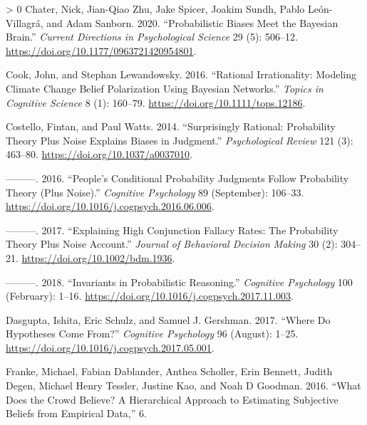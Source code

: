 \documentclass{article}
\newlength{\cslhangindent}
\newenvironment{CSLReferences}[3] %
 {%
  \setlength{\parindent}{0pt}
  \ifodd #1 \everypar{\setlength{\hangindent}{\cslhangindent}}\ignorespaces\fi
  \ifnum #2 > 0
  \setlength{\parskip}{#2\baselineskip}
  \fi
 }%
 {}
\begin{document}
\hypertarget{refs}{}
\begin{CSLReferences}{1}{0}
\leavevmode\hypertarget{ref-chater.etal2020}{}%
Chater, Nick, Jian-Qiao Zhu, Jake Spicer, Joakim Sundh, Pablo
León-Villagrá, and Adam Sanborn. 2020. {``Probabilistic {Biases Meet}
the {Bayesian Brain}.''} \emph{Current Directions in Psychological
Science} 29 (5): 506--12.
\url{https://doi.org/10.1177/0963721420954801}.

\leavevmode\hypertarget{ref-cook.lewandowsky2016}{}%
Cook, John, and Stephan Lewandowsky. 2016. {``Rational {Irrationality}:
{Modeling Climate Change Belief Polarization Using Bayesian
Networks}.''} \emph{Topics in Cognitive Science} 8 (1): 160--79.
\url{https://doi.org/10.1111/tops.12186}.

\leavevmode\hypertarget{ref-costello.watts2014}{}%
Costello, Fintan, and Paul Watts. 2014. {``Surprisingly Rational:
{Probability} Theory Plus Noise Explains Biases in Judgment.''}
\emph{Psychological Review} 121 (3): 463--80.
\url{https://doi.org/10.1037/a0037010}.

\leavevmode\hypertarget{ref-costello.watts2016}{}%
---------. 2016. {``People's Conditional Probability Judgments Follow
Probability Theory (Plus Noise).''} \emph{Cognitive Psychology} 89
(September): 106--33.
\url{https://doi.org/10.1016/j.cogpsych.2016.06.006}.

\leavevmode\hypertarget{ref-costello.watts2017}{}%
---------. 2017. {``Explaining {High Conjunction Fallacy Rates}: {The
Probability Theory Plus Noise Account}.''} \emph{Journal of Behavioral
Decision Making} 30 (2): 304--21.
\url{https://doi.org/10.1002/bdm.1936}.

\leavevmode\hypertarget{ref-costello.watts2018}{}%
---------. 2018. {``Invariants in Probabilistic Reasoning.''}
\emph{Cognitive Psychology} 100 (February): 1--16.
\url{https://doi.org/10.1016/j.cogpsych.2017.11.003}.

\leavevmode\hypertarget{ref-dasgupta.etal2017}{}%
Dasgupta, Ishita, Eric Schulz, and Samuel J. Gershman. 2017. {``Where Do
Hypotheses Come From?''} \emph{Cognitive Psychology} 96 (August): 1--25.
\url{https://doi.org/10.1016/j.cogpsych.2017.05.001}.

\leavevmode\hypertarget{ref-franke.etal2016}{}%
Franke, Michael, Fabian Dablander, Anthea Scholler, Erin Bennett, Judith
Degen, Michael Henry Tessler, Justine Kao, and Noah D Goodman. 2016.
{``What Does the Crowd Believe? {A} Hierarchical Approach to Estimating
Subjective Beliefs from Empirical Data,''} 6.


\end{CSLReferences}
\end{document}
